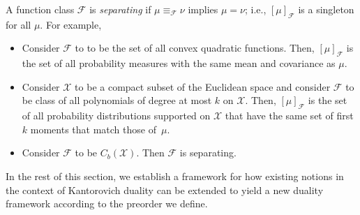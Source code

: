 \documentclass[10pt]{article}
\newcommand{\calF}{\mathcal{F}}
\newcommand{\calX}{\mathcal{X}}
\numberwithin{equation}{section}
\begin{document}
A function class $\calF$ is {\em separating} if $\mu \equiv_\calF \nu$ implies $\mu=\nu$; i.e., $[\mu]_\calF$ is a singleton for all $\mu$. For example, 
\begin{itemize}
\item Consider $\calF$ to to be the set of all convex quadratic functions. Then, $[\mu]_\calF$ is the set of all probability measures with the same mean and covariance as $\mu$. 

\item Consider $\calX$ to be a compact subset of the Euclidean space and consider $\calF$ to be class of all polynomials of degree at most $k$ on $\calX$. Then, $[\mu]_\calF$ is the set of all probability distributions supported on $\calX$ that have the same set of first $k$ moments that match those of~$\mu$. 

\item Consider $\calF$ to be $C_b(\mathcal{X})$. Then $\calF$ is separating. 

\end{itemize}
In the rest of this section, we establish a framework for how existing notions in the context of Kantorovich duality can be extended to yield a new duality framework according to the preorder we define. 
\end{document}
